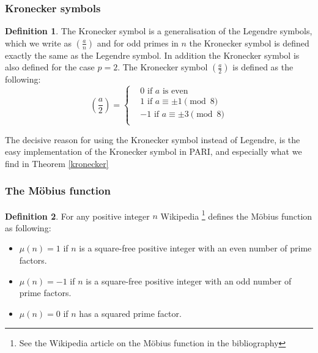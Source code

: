 \documentclass{article}
\theoremstyle{definition}
\newtheorem{definition}{Definition}[section]
\theoremstyle{remark}
\begin{document}
\subsubsection{Kronecker symbols}
\begin{definition}\label{defKronecker}
The Kronecker symbol is a generalisation of the Legendre symbols, which we write as $(\frac{a}{n})$ and for odd primes in $n$ the Kronecker symbol is defined exactly the same as the Legendre symbol. In addition the Kronecker symbol is also defined for the case $p=2$.
\newline
The Kronecker symbol $(\frac{a}{2})$ is defined as the following:
$$\left(\frac{a}{2}\right) = \begin{cases}
& 0 \text{ if } a \text{ is even } \\
& 1 \text{ if } a \equiv \pm1 \pmod{8} \\
& -1 \text{ if } a \equiv \pm3 \pmod{8} \\
\end{cases}$$
\end{definition}
The decisive reason for using the Kronecker symbol instead of Legendre, is the easy implementation of the Kronecker symbol in PARI, and especially what we find in Theorem \ref{kronecker}

\subsubsection{The Möbius function}
\begin{definition}
For any positive integer $n$ Wikipedia \footnote{See the Wikipedia article on the Möbius function in the bibliography} defines the Möbius function as following:
\begin{itemize}
\item $\mu(n)= 1$ if $n$ is a square-free positive integer with an even number of prime factors.
\item $\mu(n)= -1$ if $n$ is a square-free positive integer with an odd number of prime factors.
\item $\mu(n)= 0$ if $n$ has a squared prime factor.
\end{itemize}
\end{definition}
\end{document}
